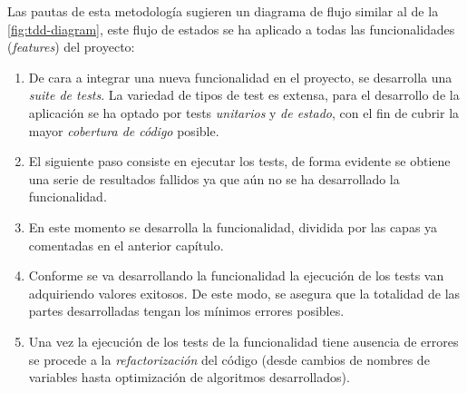 Las pautas de esta metodología sugieren un diagrama de flujo similar al de la \autoref{fig:tdd-diagram},
este flujo de estados se ha aplicado a todas las funcionalidades (\textit{features}) del
proyecto:

\begin{enumerate}
    \item De cara a integrar una nueva funcionalidad en el proyecto, se desarrolla una
    \textit{suite de tests}. La variedad de tipos de test es extensa, para el desarrollo
    de la aplicación se ha optado por tests \textit{unitarios} y \textit{de estado},
    con el fin de cubrir la mayor \textit{cobertura de código} posible.
    \item El siguiente paso consiste en ejecutar los tests, de forma evidente se obtiene 
    una serie de resultados fallidos ya que aún no se ha desarrollado la funcionalidad.
    \item En este momento se desarrolla la funcionalidad, dividida por las capas
    ya comentadas en el anterior capítulo.
    \item Conforme se va desarrollando la funcionalidad la ejecución de los tests
    van adquiriendo valores exitosos. De este modo, se asegura que la totalidad de las partes desarrolladas
    tengan los mínimos errores posibles.
    \item Una vez la ejecución de los tests de la funcionalidad tiene ausencia de errores 
    se procede a la \textit{refactorización} del código (desde cambios de nombres de variables
    hasta optimización de algoritmos desarrollados).
 \end{enumerate}